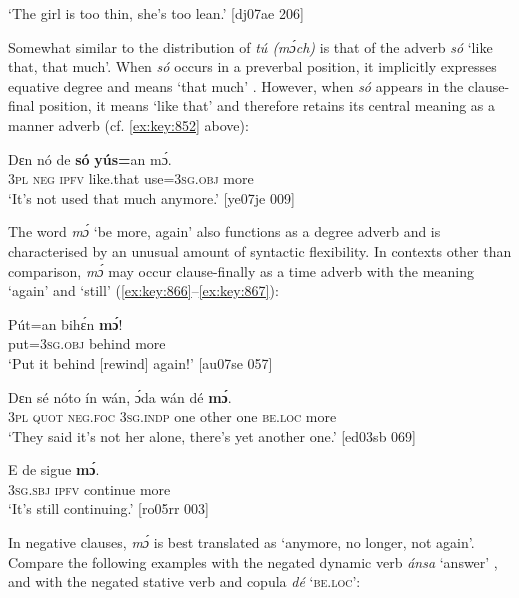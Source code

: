 \glt ‘The girl is too thin, she’s too lean.’ [dj07ae 206]
\z

Somewhat similar to the distribution of \textit{tú (mɔ́ch)} is that of the adverb \textit{só} ‘like that, that much’. When \textit{só} occurs in a preverbal position, it implicitly expresses equative degree and means ‘that much’ . However, when \textit{só} appears in the clause-final position, it means ‘like that’ and therefore retains its central meaning as a manner adverb (cf. \ref{ex:key:852} above):


\ea%
    \label{ex:key:864}
    \gll Dɛn  nó  de  \textbf{só}    \textbf{yús=}an    mɔ́.\\
\textsc{3pl}  \textsc{neg}  \textsc{ipfv}  like.that  use=\textsc{3sg.obj}  more\\

\glt ‘It’s not used that much anymore.’ [ye07je 009]
\z

The word \textit{mɔ́} ‘be more, again’ also functions as a degree adverb and is characterised by an unusual amount of syntactic flexibility. In contexts other than comparison, \textit{mɔ́} may occur clause-finally as a time adverb with the meaning ‘again’  and ‘still’ (\ref{ex:key:866}–\ref{ex:key:867}):


\ea%
    \label{ex:key:865}
    \gll Pút=an    bihɛ́n  \textbf{mɔ́}!\\
put=\textsc{3sg.obj}  behind  more\\

\glt ‘Put it behind [rewind] again!’ [au07se 057]
\z


\ea%
    \label{ex:key:866}
    \gll Dɛn  sé    nóto  ín    wán,  ɔ́da    wán    dé    \textbf{mɔ́}.\\
\textsc{3pl}  \textsc{quot}    \textsc{neg}.\textsc{foc}  \textsc{3sg.indp}  one    other  one    \textsc{be.loc}  more\\

\glt ‘They said it’s not her alone, there’s yet another one.’ [ed03sb 069]
\z


\ea%
    \label{ex:key:867}
    \gll E    de  sigue  \textbf{mɔ́}.\\
\textsc{3sg.sbj}  \textsc{ipfv}  continue  more\\

\glt ‘It’s still continuing.’ [ro05rr 003]
\z

In negative clauses, \textit{mɔ́} is best translated as ‘anymore, no longer, not again’. Compare the following examples with the negated dynamic verb \textit{ánsa} ‘answer’ , and  with the negated stative verb and copula \textit{dé} ‘\textsc{be.loc}’:


